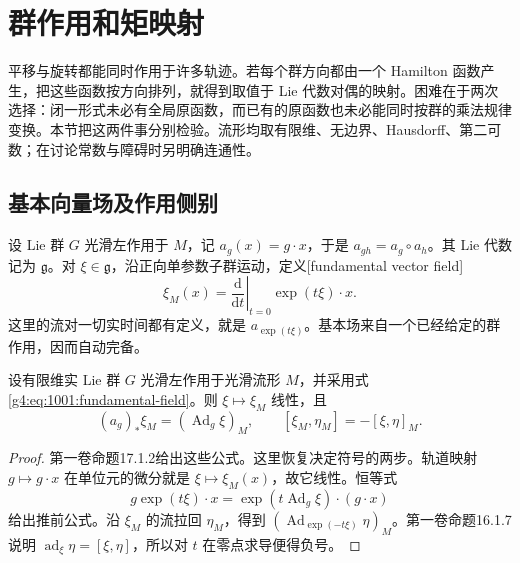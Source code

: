 
% 
% 

\section{群作用和矩映射}
\label{g4:sec:1001}

平移与旋转都能同时作用于许多轨迹。若每个群方向都由一个 Hamilton 函数产生，把这些函数按方向排列，就得到取值于 Lie 代数对偶的映射。困难在于两次选择：闭一形式未必有全局原函数，而已有的原函数也未必能同时按群的乘法规律变换。本节把这两件事分别检验。流形均取有限维、无边界、Hausdorff、第二可数；在讨论常数与障碍时另明确连通性。

\subsection{基本向量场及作用侧别}
\label{g4:subsec:1001:01}

设 Lie 群 \(G\) 光滑左作用于 \(M\)，记 \(a_g(x)=g\cdot x\)，于是 \(a_{gh}=a_g\circ a_h\)。其 Lie 代数记为 \(\mathfrak g\)。对 \(\xi\in\mathfrak g\)，沿正向单参数子群运动，定义[fundamental vector field]
\begin{equation}\label{g4:eq:1001:fundamental-field}
	\xi_M(x)=\left.\frac{\mathrm{d}}{\mathrm{d}t}\right|_{t=0}\exp(t\xi)\cdot x.
\end{equation}
这里的流对一切实时间都有定义，就是 \(a_{\exp(t\xi)}\)。基本场来自一个已经给定的群作用，因而自动完备。

\begin{proposition}\label{g4:prop:1001:fundamental-fields}
	设有限维实 Lie 群 \(G\) 光滑左作用于光滑流形 \(M\)，并采用式\eqref{g4:eq:1001:fundamental-field}。则 \(\xi\mapsto\xi_M\) 线性，且
	\begin{equation}\label{g4:eq:1001:fundamental-bracket}
		(a_g)_*\xi_M=(\operatorname{Ad}_g\xi)_M,
		\qquad [\xi_M,\eta_M]=-[\xi,\eta]_M.
	\end{equation}
\end{proposition}
\begin{proof}
	第一卷命题17.1.2给出这些公式。这里恢复决定符号的两步。轨道映射 \(g\mapsto g\cdot x\) 在单位元的微分就是 \(\xi\mapsto\xi_M(x)\)，故它线性。恒等式
	\[
		g\exp(t\xi)\cdot x=\exp(t\operatorname{Ad}_g\xi)\cdot(g\cdot x)
	\]
	给出推前公式。沿 \(\xi_M\) 的流拉回 \(\eta_M\)，得到 \((\operatorname{Ad}_{\exp(-t\xi)}\eta)_M\)。第一卷命题16.1.7说明 \(\operatorname{ad}_\xi\eta=[\xi,\eta]\)，所以对 \(t\) 在零点求导便得负号。
\end{proof}

